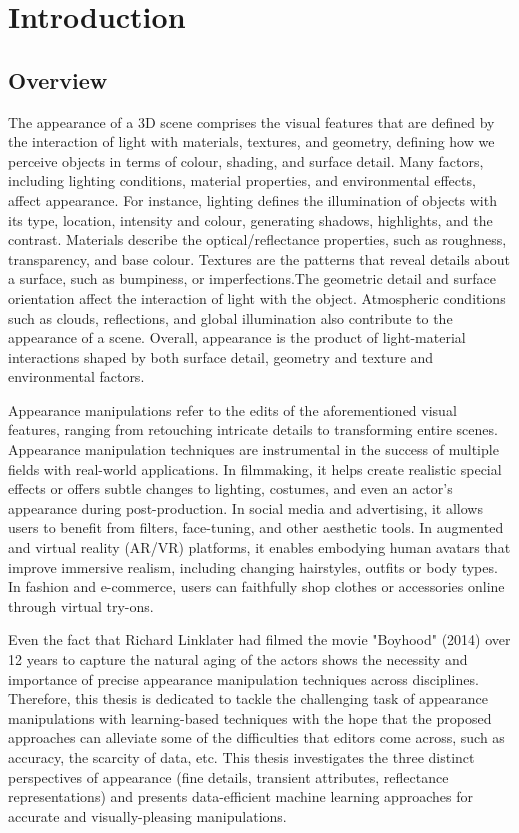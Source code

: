 \chapter{Introduction}






\section{Overview} 

The appearance of a 3D scene comprises the visual features that are defined by the interaction of light with materials, textures, and geometry, defining how we perceive objects in terms of colour, shading, and surface detail. Many factors, including lighting conditions, material properties, and environmental effects, affect appearance. For instance, lighting defines the illumination of objects with its type, location, intensity and colour, generating shadows, highlights, and the contrast. Materials describe the optical/reflectance properties, such as roughness, transparency, and base colour. Textures are the patterns that reveal details about a surface, such as bumpiness, or imperfections.The geometric detail and surface orientation affect the interaction of light with the object. Atmospheric conditions such as clouds, reflections, and global illumination also contribute to the appearance of a scene. Overall, appearance is the product of light-material interactions shaped by both surface detail, geometry and texture and environmental factors. 
 
Appearance manipulations refer to the edits of the aforementioned visual features, ranging from retouching intricate details to transforming entire scenes. Appearance manipulation techniques are instrumental in the success of multiple fields with real-world applications. In filmmaking, it helps create realistic special effects or offers subtle changes to lighting, costumes, and even an actor’s appearance during post-production. In social media and advertising, it allows users to benefit from filters, face-tuning, and other aesthetic tools. In augmented and virtual reality (AR/VR) platforms, it enables embodying human avatars that improve immersive realism, including changing hairstyles, outfits or body types. In fashion and e-commerce, users can faithfully shop clothes or accessories online through virtual try-ons. 

Even the fact that Richard Linklater had filmed the movie "Boyhood" (2014) over 12 years to capture the natural aging of the actors shows the necessity and importance of precise appearance manipulation techniques across disciplines. Therefore, this thesis is dedicated to tackle the challenging task of appearance manipulations with learning-based techniques with the hope that the proposed approaches can alleviate some of the difficulties that editors come across, such as accuracy, the scarcity of data, etc. This thesis investigates the three distinct perspectives of appearance (fine details, transient attributes, reflectance representations) and presents data-efficient machine learning approaches for accurate and visually-pleasing manipulations.


